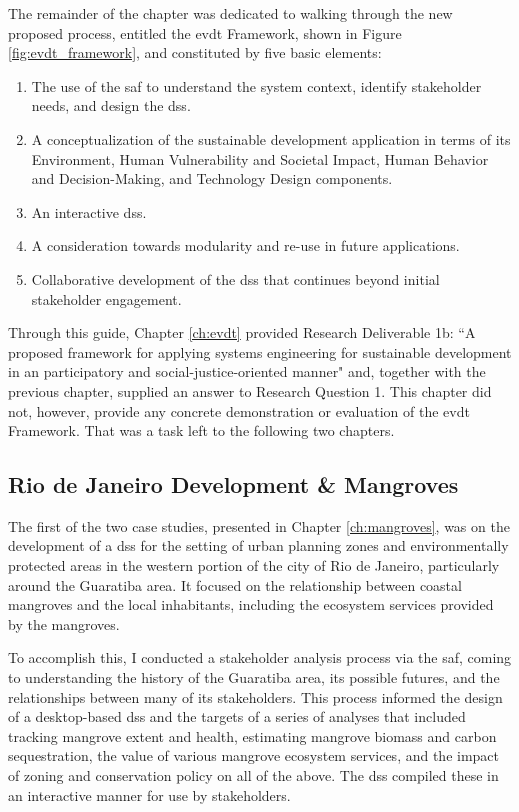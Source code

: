 The remainder of the chapter was dedicated to walking through the new proposed process, entitled the \ac{evdt} Framework, shown in Figure \ref{fig:evdt_framework}, and constituted by five basic elements:

\begin{enumerate}[label=\emph{\Alph*)},itemsep=0pt,parsep=0pt]
	\item{The use of the \acf{saf} to understand the system context, identify stakeholder needs, and design the \ac{dss}.}
	\item{A conceptualization of the sustainable development application in terms of its Environment, Human Vulnerability and Societal Impact, Human Behavior and Decision-Making, and Technology Design components.}
	\item{An interactive \ac{dss}.}
	\item{A consideration towards modularity and re-use in future applications.}
	\item{Collaborative development of the \ac{dss} that continues beyond initial stakeholder engagement.}
\end{enumerate}

Through this guide, Chapter \ref{ch:evdt} provided Research Deliverable 1b: ``A proposed framework for applying systems engineering for sustainable development in an participatory and social-justice-oriented manner" and, together with the previous chapter, supplied an answer to Research Question 1. This chapter did not, however, provide any concrete demonstration or evaluation of the \ac{evdt} Framework. That was a task left to the following two chapters.

\subsection{Rio de Janeiro Development \& Mangroves}

The first of the two case studies, presented in Chapter \ref{ch:mangroves}, was on the development of a \ac{dss} for the setting of urban planning zones and environmentally protected areas in the western portion of the city of Rio de Janeiro, particularly around the Guaratiba area. It focused on the relationship between coastal mangroves and the local inhabitants, including the ecosystem services provided by the mangroves.

To accomplish this, I conducted a stakeholder analysis process via the \ac{saf}, coming to understanding the history of the Guaratiba area, its possible futures, and the relationships between many of its stakeholders. This process informed the design of a desktop-based \ac{dss} and the targets of a series of analyses that included tracking mangrove extent and health, estimating mangrove biomass and carbon sequestration, the value of various mangrove ecosystem services, and the impact of zoning and conservation policy on all of the above. The \ac{dss} compiled these in an interactive manner for use by stakeholders.


